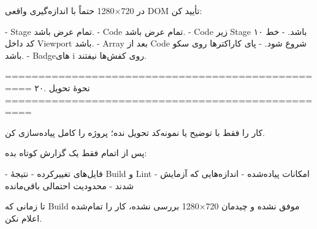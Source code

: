 در 720×1280 حتماً با اندازه‌گیری واقعی DOM تأیید کن:

- Stage تمام عرض باشد.
- Code تمام عرض باشد.
- Code زیر Stage باشد.
- خط ۱۰ کد داخل Viewport باشد.
- Array بعد از Code شروع شود.
- پای کاراکترها روی سکو باشد.
- Badgeهای i روی کفش‌ها نیفتند.

==================================================
۲۰. نحوهٔ تحویل
==================================================

کار را فقط با توضیح یا نمونه‌کد تحویل نده؛ پروژه را کامل پیاده‌سازی کن.

پس از اتمام فقط یک گزارش کوتاه بده:

- فایل‌های تغییرکرده
- نتیجهٔ Build و Lint
- امکانات پیاده‌شده
- اندازه‌هایی که آزمایش شدند
- محدودیت احتمالی باقی‌مانده

تا زمانی که Build موفق نشده و چیدمان 720×1280 بررسی نشده، کار را تمام‌شده اعلام نکن.